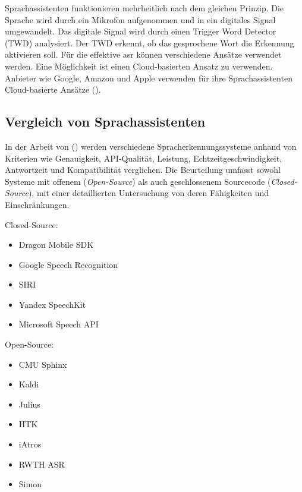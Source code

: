 \documentclass[11pt,a4paper]{article}
\begin{document}
\noindent \newline
Sprachassistenten funktionieren mehrheitlich nach dem gleichen Prinzip. Die Sprache wird
durch ein Mikrofon aufgenommen und in ein digitales Signal umgewandelt. Das digitale Signal wird
durch einen Trigger Word Detector (TWD) analysiert. Der TWD erkennt, ob das gesprochene Wort die 
Erkennung aktivieren soll. Für die effektive \gls{asr} können verschiedene Ansätze verwendet
werden. Eine Möglichkeit ist einen Cloud-basierten Ansatz zu verwenden. Anbieter wie Google,
Amazon und Apple verwenden für ihre Sprachassistenten Cloud-basierte Ansätze 
(\cite{matarneh2017speechrecognition}). 

\subsection{Vergleich von Sprachassistenten}\label{sec:vergleich_sprachassistenten}

In der Arbeit von (\cite{matarneh2017speechrecognition}) werden verschiedene Spracherkennungssysteme 
anhand von Kriterien wie Genauigkeit, API-Qualität, Leistung, Echtzeitgeschwindigkeit, 
Antwortzeit und Kompatibilität verglichen. Die Beurteilung umfasst sowohl Systeme mit offenem 
(\textit{Open-Source}) als auch geschlossenem Sourcecode (\textit{Closed-Source}), mit einer 
detaillierten Untersuchung von deren Fähigkeiten und Einschränkungen.

\raggedcolumns
\begin{multicols}{2}
	\small 
	\setlength\itemsep{0em} 
	
	\noindent Closed-Source:
	\begin{itemize}[itemsep=0px, parsep=0px]
	\item Dragon Mobile SDK
	\item Google Speech Recognition
	\item SIRI
	\item Yandex SpeechKit
	\item Microsoft Speech API
	\end{itemize}
	
	\columnbreak
	
	\noindent Open-Source:
	\begin{itemize}[itemsep=0px, parsep=0px]
	\item CMU Sphinx
	\item Kaldi
	\item Julius
	\item HTK
	\item iAtros
	\item RWTH ASR
	\item Simon
	\end{itemize}
\end{multicols}
	
\end{document}
